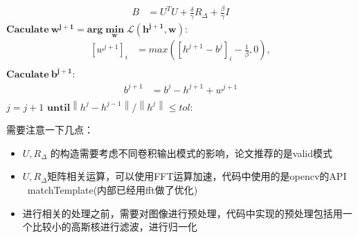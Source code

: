 \documentclass[UTF8]{ctexart}
\begin{document}
\begin{sloppypar}
\begin{algorithm}
\begin{algorithmic}
\begin{equation}
\begin{aligned}
                        B       &= U^{T}U+\frac{\delta}{\gamma}R_{\Delta} + \frac{\beta}{\gamma}I
                    \end{aligned}
                \end{equation}
                \STATE $\bm{Caculate \ w^{j+1} = arg \min\limits_{w} \mathcal{L}(h^{j+1},w) }$:
                \begin{equation}
                    \begin{aligned}
                    [w^{j+1}]_i &=max([h^{j+1}-b^j]_i-\frac{1}{\beta},0), \\
                    \end{aligned}
                \end{equation}
                \STATE $\bm{Caculate \ b^{j+1} }$:
                \begin{equation}
                    \begin{aligned}
                        b^{j+1} &= b^{j} - h^{j+1} + w^{j+1}\\
                    \end{aligned}
                \end{equation}
                \STATE $j = j+1$
                \STATE $\bm{until} \left\| h^{j} - h^{j-1} \right\|/\left\| h^{j} \right\| \leq tol$:
            \end{algorithmic}
            \label{alg:ALM_Hstep}
        \end{algorithm}
        需要注意一下几点：
        \begin{itemize}
            \item $U,R_\Delta$ 的构造需要考虑不同卷积输出模式的影响，论文推荐的是valid模式
            \item $U,R_\Delta$矩阵相关运算，可以使用FFT运算加速，代码中使用的是opencv的API \ matchTemplate(内部已经用fft做了优化)
            \item 进行相关的处理之前，需要对图像进行预处理，代码中实现的预处理包括用一个比较小的高斯核进行滤波，进行归一化
        \end{itemize}

\end{sloppypar}
\end{document}
